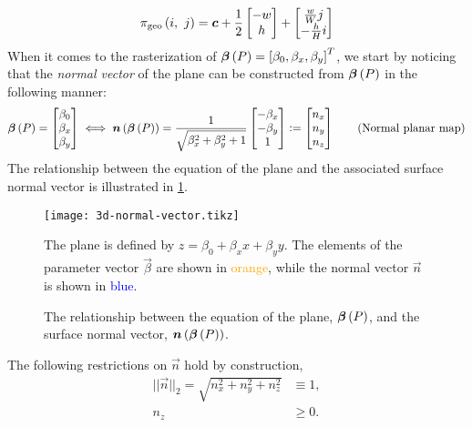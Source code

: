\begin{equation*}
  \pi_{\mathrm{geo}}\left(i,~j\right)
  =
  \boldsymbol{c}
  +
  \frac{1}{2} \begin{bmatrix}
    -w\\
    h
  \end{bmatrix}
  +
  \begin{bmatrix}
    \frac{w}{W} j\\
    -\frac{h}{H} i\\
  \end{bmatrix}
\end{equation*}
When it comes to the rasterization of $\boldsymbol{\beta}\left(P\right) = {[\beta_0, \beta_x, \beta_y]}^T$, we start by noticing that the \textit{normal vector} of the plane can be constructed from $\boldsymbol{\beta}\left(P\right)$ in the following manner:
\begin{equation*}
  \boldsymbol{\beta}\left(P\right)
  =
  \begin{bmatrix}
    \beta_0\\
    \beta_x\\
    \beta_y\\
  \end{bmatrix}
  \iff
  \boldsymbol{n}\left(\boldsymbol{\beta}\left(P\right)\right)
  =
  \frac{1}{\sqrt{\beta_x^2 + \beta_y^2 + 1}}
  \begin{bmatrix}
    -\beta_x\\
    -\beta_y\\
    1
  \end{bmatrix}
  \vcentcolon=
  \begin{bmatrix}
    n_x\\
    n_y\\
    n_z
  \end{bmatrix}
  \tag{Normal planar map}\label{eq:normalplanar}
\end{equation*}
The relationship between the equation of the plane and the associated surface normal vector is illustrated in \cref{fig:3d-normal-vector}.
\begin{figure}[H]
  \centering
  \texttt{[image: 3d-normal-vector.tikz]}
  \caption{%
    The relationship between the equation of the plane, $\boldsymbol{\beta}\left(P\right)$, and the surface normal vector, $\boldsymbol{n}\left(\boldsymbol{\beta}\left(P\right)\right)$.
  }{%
    The plane is defined by $z = \beta_0 + \beta_x x + \beta_y y$.
    The elements of the parameter vector $\vec{\beta}$ are shown in \textcolor{orange}{orange}, while the normal vector $\vec{n}$ is shown in \textcolor{blue}{blue}.
  }%
  \label{fig:3d-normal-vector}
\end{figure}
\noindent
The following restrictions on $\vec{n}$ hold by construction,
\begin{align*}
  ||\vec{n}||_2 = \sqrt{n_x^2 + n_y^2 + n_z^2} &\equiv 1,
  \\
  n_z &\geq 0.
\end{align*}
